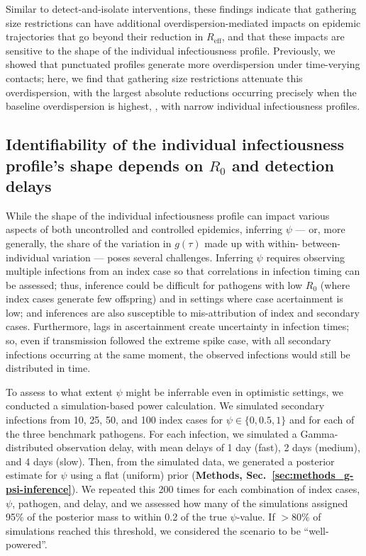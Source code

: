 Similar to detect-and-isolate interventions, these findings indicate that gathering size restrictions can have additional overdispersion-mediated impacts on epidemic trajectories that go beyond their reduction in $R_\text{eff}$, and that these impacts are sensitive to the shape of the individual infectiousness profile. Previously, we showed that punctuated profiles generate more overdispersion under time-verying contacts; here, we find that gathering size restrictions attenuate this overdispersion, with the largest absolute reductions occurring precisely when the baseline overdispersion is highest, \ie, with narrow individual infectiousness profiles. 

\subsection{Identifiability of the individual infectiousness profile's shape depends on $R_0$ and detection delays}

While the shape of the individual infectiousness profile can impact various aspects of both uncontrolled and controlled epidemics, inferring $\psi$ --- or, more generally, the share of the variation in $g(\tau)$ made up with within- \vs between-individual variation --- poses several challenges. Inferring $\psi$ requires observing multiple infections from an index case so that correlations in infection timing can be assessed; thus, inference could be difficult for pathogens with low $R_0$ (where index cases generate few offspring) and in settings where case acertainment is low; and inferences are also susceptible to mis-attribution of index and secondary cases. Furthermore, lags in ascertainment create uncertainty in infection times; so, even if transmission followed the extreme spike case, with all secondary infections occurring at the same moment, the observed infections would still be distributed in time. 

To assess to what extent $\psi$ might be inferrable even in optimistic settings, we conducted a simulation-based power calculation. We simulated secondary infections from 10, 25, 50, and 100 index cases for $\psi \in \{0, 0.5, 1\}$ and for each of the three benchmark pathogens. For each infection, we simulated a Gamma-distributed observation delay, with mean delays  of 1 day (fast), 2 days (medium), and 4 days (slow). Then, from the simulated data, we generated a posterior estimate for $\psi$ using a flat (uniform) prior ({\bf Methods, Sec.~\ref{sec:methods_g-psi-inference}}). We repeated this 200 times for each combination of index cases, $\psi$, pathogen, and delay, and we assessed how many of the simulations assigned 95\% of the posterior mass to within 0.2 of the true $\psi$-value. If $>80\%$ of simulations reached this threshold, we considered the scenario to be ``well-powered''. 

